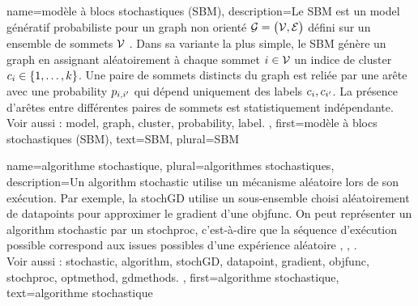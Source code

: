 {name={modèle à blocs stochastiques (SBM)},
	description={Le SBM est un \gls{model} génératif probabiliste 
		pour un \gls{graph} non orienté $\mathcal{G} = \big( \mathcal{V}, \mathcal{E} \big)$ 
		défini sur un ensemble de sommets $\mathcal{V}$ \cite{AbbeSBM2018}. 
		Dans sa variante la plus simple, le SBM génère un \gls{graph} en 
		assignant aléatoirement à chaque sommet $i \in \mathcal{V}$ 
		un indice de \gls{cluster} $c_{i} \in \{1, \ldots, k\}$. 
		Une paire de sommets distincts du \gls{graph} est reliée par une arête avec une 
		\gls{probability} $p_{i,i'}$ qui dépend uniquement des \glspl{label} 
		$c_{i}, c_{i'}$. 
		La présence d’arêtes entre différentes paires de sommets est statistiquement indépendante.
		\\
		Voir aussi : \gls{model}, \gls{graph}, \gls{cluster}, \gls{probability}, \gls{label}. },
	first={modèle à blocs stochastiques (SBM)},
	text={SBM}, plural={SBM}
}

{name={algorithme stochastique}, 
	plural={algorithmes stochastiques},
	description={Un \gls{algorithm} \gls{stochastic} utilise un mécanisme aléatoire 
		lors de son exécution. Par exemple, la \gls{stochGD} utilise un sous-ensemble choisi aléatoirement de \glspl{datapoint} 
		pour approximer le \gls{gradient} d’une \gls{objfunc}. 
		On peut représenter un \gls{algorithm} \gls{stochastic} par un \gls{stochproc}, c’est-à-dire que la séquence d’exécution 
		possible correspond aux issues possibles d’une expérience aléatoire \cite{BertsekasProb}, \cite{RandomizedAlgos}, \cite{Gallager13}.
		\\
		Voir aussi : \gls{stochastic}, \gls{algorithm}, \gls{stochGD}, \gls{datapoint}, \gls{gradient}, \gls{objfunc}, \gls{stochproc}, \gls{optmethod}, \gls{gdmethods}. },
	first={algorithme stochastique},
	text={algorithme stochastique} 
}

